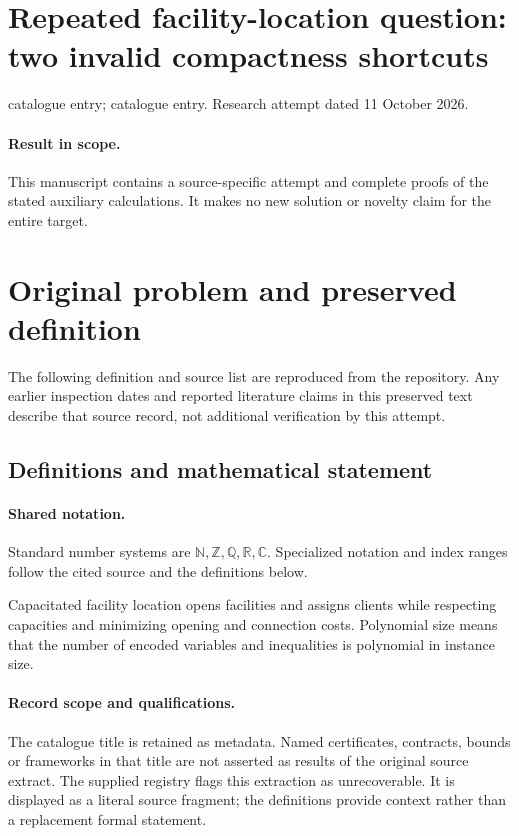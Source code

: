 \documentclass[11pt]{article}
\begin{document}
\section*{Repeated facility-location question: two invalid compactness shortcuts}
\noindent catalogue entry; catalogue entry. Research attempt dated 11 October 2026.
\paragraph{Result in scope.}This manuscript contains a source-specific attempt and complete proofs of the stated auxiliary calculations. It makes no new solution or novelty claim for the entire target.
\section{Original problem and preserved definition}
The following definition and source list are reproduced from the repository. Any earlier inspection dates and reported literature claims in this preserved text describe that source record, not additional verification by this attempt.
\subsection{Definitions and mathematical statement}

\paragraph{Shared notation.}Standard number systems are $\mathbb N,\mathbb Z,\mathbb Q,\mathbb R,\mathbb C$. Specialized notation and index ranges follow the cited source and the definitions below.


Capacitated facility location opens facilities and assigns clients while respecting capacities and minimizing opening and connection costs. Polynomial size means that the number of encoded variables and inequalities is polynomial in instance size.
\paragraph{Record scope and qualifications.}
The catalogue title is retained as metadata. Named certificates, contracts, bounds or frameworks in that title are not asserted as results of the original source extract.
The supplied registry flags this extraction as unrecoverable. It is displayed as a literal source fragment; the definitions provide context rather than a replacement formal statement.
\end{document}
